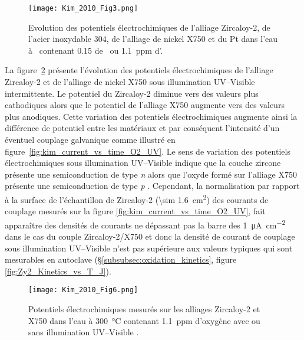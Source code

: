\begin{refsection}
    \begin{figure}[H] 
            \centering 
            \texttt{[image: Kim\_2010\_Fig3.png]} 
            \caption[Evolution des potentiels électrochimiques de l’alliage Zircaloy-2, de l’acier inoxydable 304,
            de l’alliage de nickel X750 et du Pt dans l'eau à \Tkim\ contenant \SI{0.15}{\ppm} de \Hyd\ ou \SI{1.1}{ppm}
        d’\Oxy.]
            {Evolution des potentiels électrochimiques de l’alliage Zircaloy-2, de l’acier inoxydable 304,
            de l’alliage de nickel X750 et du Pt dans l'eau à \Tkim\ contenant \SI{0.15}{\ppm} de \Hyd\ ou \SI{1.1}{ppm}
        d’\Oxy \citep{Kim2010}.} 
            \label{fig:kim_ecp_vs_time_H2_O2} 
        \end{figure}


    La figure~\ref{fig:kim_ecp_vs_time_O2_UV} présente l’évolution des potentiels électrochimiques de l’alliage 
    Zircaloy-2 et de l’alliage de nickel X750 sous illumination UV--Visible intermittente. Le potentiel du Zircaloy-2 diminue vers
    des valeurs plus cathodiques alors que le potentiel de l’alliage X750 augmente vers des valeurs plus anodiques.
    Cette
    variation des potentiels électrochimiques augmente ainsi la différence de potentiel entre les matériaux et par
    conséquent l'intensité d'un éventuel couplage galvanique comme
    illustré en figure~\ref{fig:kim_current_vs_time_O2_UV}. Le sens de variation des potentiels électrochimiques
    sous illumination UV--Visible indique que la couche zircone présente une semiconduction de type \emph{n} alors que l’oxyde 
    formé sur l’alliage X750 présente une semiconduction de type \emph{p} \citep{Memming2008}.
    Cependant, la normalisation
    par rapport à la surface de l'échantillon de Zircaloy-2 (\SI{\sim 1.6}{\square\centi\meter}) des courants de couplage
    mesurés sur la figure \ref{fig:kim_current_vs_time_O2_UV}, fait apparaître des densités de courants ne dépassant
    pas la barre des \SI{1}{\micro\ampere\per\square\centi\meter} dans le cas du couple Zircaloy-2/X750 et donc la
    densité de courant de couplage sous illumination UV--Visible 
    n'est pas supérieure aux valeurs typiques qui sont mesurables en autoclave (\S\ref{subsubsec:oxidation_kinetics}, figure
    \ref{fig:Zy2_Kinetics_vs_T_J}).

    
    \begin{figure}[H] 
        \centering 
        \texttt{[image: Kim\_2010\_Fig6.png]} 
        \caption[Potentiels électrochimiques mesurés sur les alliages Zircaloy-2 et X750 dans l'eau à
        \SI{300}{\degreeCelsius} contenant \SI{1.1}{ppm} d'oxygène avec ou sans illumination UV--Visible.]
        {Potentiels électrochimiques mesurés sur les alliages Zircaloy-2 et X750 dans l'eau à
        \SI{300}{\degreeCelsius} contenant \SI{1.1}{ppm} d'oxygène avec ou sans illumination UV--Visible \citep{Kim2010}.} 
        \label{fig:kim_ecp_vs_time_O2_UV} 
    \end{figure}


\end{refsection}
